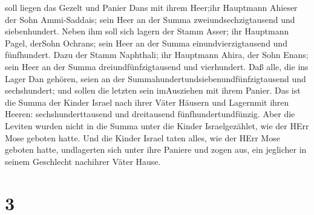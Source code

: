soll liegen das Gezelt und Panier Dans mit ihrem Heer;ihr Hauptmann
Ahieser der Sohn Ammi-Saddais;  sein Heer an der Summa
zweiundsechzigtausend und siebenhundert.  Neben ihm soll
sich lagern der Stamm Asser; ihr Hauptmann Pagel, derSohn Ochrans;
 sein Heer an der Summa einundvierzigtausend und
fünfhundert.  Dazu der Stamm Naphthali; ihr Hauptmann
Ahira, der Sohn Enans;  sein Heer an der Summa
dreiundfünfzigtausend und vierhundert.  Daß alle, die ins
Lager Dan gehören, seien an der Summahundertundsiebenundfünfzigtausend
und sechshundert; und sollen die letzten sein imAusziehen mit ihrem
Panier.  Das ist die Summa der Kinder Israel nach ihrer
Väter Häusern und Lagernmit ihren Heeren: sechshunderttausend und
dreitausend fünfhundertundfünzig.  Aber die Leviten wurden
nicht in die Summa unter die Kinder Israelgezählet, wie der HErr Mose
geboten hatte.  Und die Kinder Israel taten alles, wie der
HErr Mose geboten hatte, undlagerten sich unter ihre Paniere und zogen
aus, ein jeglicher in seinem Geschlecht nachihrer Väter Hause.

\hypertarget{section-2}{%
\section{3}\label{section-2}}

